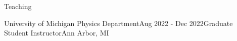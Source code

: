 \documentclass{resume} %
\begin{document}
\begin{rSection}{Teaching}
\begin{rSubsection}{University of Michigan Physics Department}{Aug 2022 - Dec 2022}{Graduate Student Instructor}{Ann Arbor, MI}
\end{rSubsection}



\end{rSection}
\end{document}
